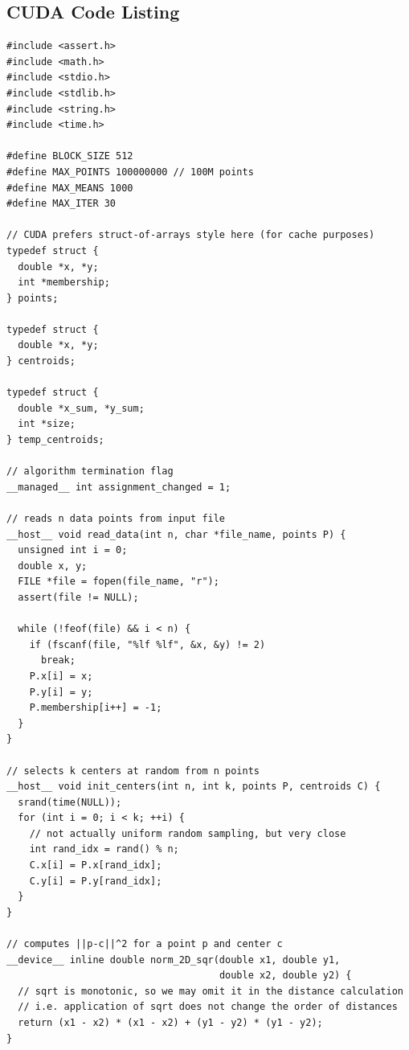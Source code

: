 \documentclass{article}
\begin{document}
	\clearpage\subsection*{CUDA Code Listing}
	\begin{lstlisting}
#include <assert.h>
#include <math.h>
#include <stdio.h>
#include <stdlib.h>
#include <string.h>
#include <time.h>

#define BLOCK_SIZE 512
#define MAX_POINTS 100000000 // 100M points
#define MAX_MEANS 1000
#define MAX_ITER 30

// CUDA prefers struct-of-arrays style here (for cache purposes)
typedef struct {
  double *x, *y;
  int *membership;
} points;

typedef struct {
  double *x, *y;
} centroids;

typedef struct {
  double *x_sum, *y_sum;
  int *size;
} temp_centroids;

// algorithm termination flag
__managed__ int assignment_changed = 1;

// reads n data points from input file
__host__ void read_data(int n, char *file_name, points P) {
  unsigned int i = 0;
  double x, y;
  FILE *file = fopen(file_name, "r");
  assert(file != NULL);

  while (!feof(file) && i < n) {
    if (fscanf(file, "%lf %lf", &x, &y) != 2)
      break;
    P.x[i] = x;
    P.y[i] = y;
    P.membership[i++] = -1;
  }
}

// selects k centers at random from n points
__host__ void init_centers(int n, int k, points P, centroids C) {
  srand(time(NULL));
  for (int i = 0; i < k; ++i) {
    // not actually uniform random sampling, but very close
    int rand_idx = rand() % n;
    C.x[i] = P.x[rand_idx];
    C.y[i] = P.y[rand_idx];
  }
}

// computes ||p-c||^2 for a point p and center c
__device__ inline double norm_2D_sqr(double x1, double y1,
                                     double x2, double y2) {
  // sqrt is monotonic, so we may omit it in the distance calculation
  // i.e. application of sqrt does not change the order of distances
  return (x1 - x2) * (x1 - x2) + (y1 - y2) * (y1 - y2);
}


\end{lstlisting}
\end{document}
